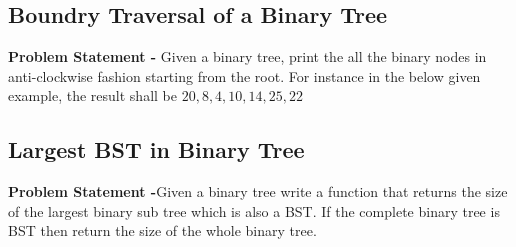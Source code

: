 \documentclass[12pt,a4paper,draft]{article}
\begin{document}
\subsection{Boundry Traversal of a Binary Tree}
\textbf{Problem Statement -} Given a binary tree, print the all the binary nodes in anti-clockwise fashion starting from the root. For instance in the below given example, the result shall be $20,8,4,10,14,25,22$
\begin{center}
\end{center}
\subsection{Largest BST in Binary Tree}
\textbf{Problem Statement -}Given a binary tree write a function that returns the size of the largest binary sub tree which is also a BST. If the complete binary tree is BST then return the size of the whole binary tree.
\begin{center}
\hspace{1cm}
\end{center}
\end{document}
